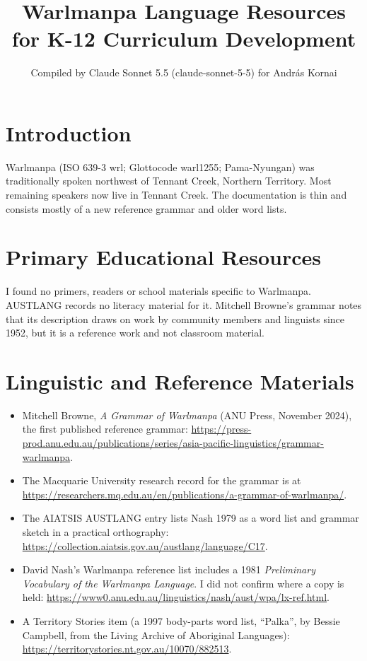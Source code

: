 \documentclass[12pt]{article}
\title{Warlmanpa Language Resources for K-12 Curriculum Development}
\author{Compiled by Claude Sonnet 5.5 (claude-sonnet-5-5) for Andr\'as Kornai}
\date{}
\begin{document}
\maketitle

\section{Introduction}
Warlmanpa (ISO 639-3 wrl; Glottocode warl1255; Pama-Nyungan) was traditionally spoken northwest of Tennant Creek, Northern Territory. Most remaining speakers now live in Tennant Creek. The documentation is thin and consists mostly of a new reference grammar and older word lists.

\section{Primary Educational Resources}
I found no primers, readers or school materials specific to Warlmanpa. AUSTLANG records no literacy material for it. Mitchell Browne's grammar notes that its description draws on work by community members and linguists since 1952, but it is a reference work and not classroom material.

\section{Linguistic and Reference Materials}
\begin{itemize}
\item Mitchell Browne, \emph{A Grammar of Warlmanpa} (ANU Press, November 2024), the first published reference grammar: \url{https://press-prod.anu.edu.au/publications/series/asia-pacific-linguistics/grammar-warlmanpa}.
\item The Macquarie University research record for the grammar is at \url{https://researchers.mq.edu.au/en/publications/a-grammar-of-warlmanpa/}.
\item The AIATSIS AUSTLANG entry lists Nash 1979 as a word list and grammar sketch in a practical orthography: \url{https://collection.aiatsis.gov.au/austlang/language/C17}.
\item David Nash's Warlmanpa reference list includes a 1981 \emph{Preliminary Vocabulary of the Warlmanpa Language}. I did not confirm where a copy is held: \url{https://www0.anu.edu.au/linguistics/nash/aust/wpa/lx-ref.html}.
\item A Territory Stories item (a 1997 body-parts word list, ``Palka'', by Bessie Campbell, from the Living Archive of Aboriginal Languages): \url{https://territorystories.nt.gov.au/10070/882513}.
\end{itemize}
\end{document}
